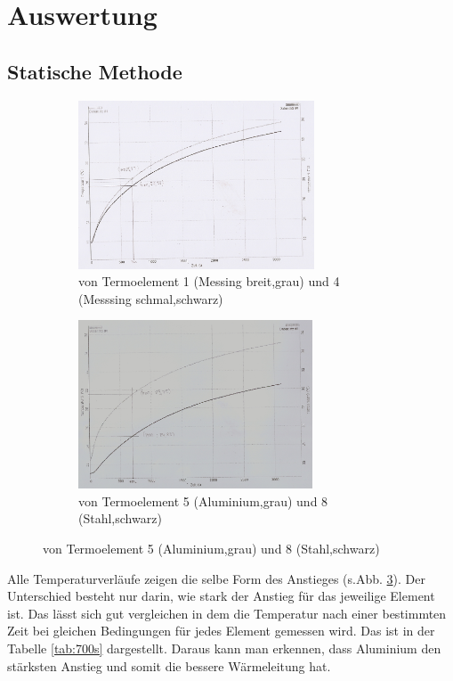 \section{Auswertung}
\label{sec:Auswertung}
\subsection{Statische Methode}
\begin{figure}
  \centering
  \caption{Temperaturverläufe im statischen Fall}
\begin{subfigure}{0.48\textwidth}
  \centering
  \includegraphics[height= 5cm]{logos/T1T4.jpg}
  \caption{von Termoelement 1 (Messing breit,grau) und 4 (Messsing schmal,schwarz)}
  \label{fig:t1t4}
\end{subfigure}
\begin{subfigure}{0.48\textwidth}
  \centering
  \includegraphics[height= 5cm]{logos/T5T8.jpg}
  \caption{von Termoelement 5 (Aluminium,grau) und 8 (Stahl,schwarz)}
  \label{fig:t5t8}
\end{subfigure}
\label{fig:sfall}
\end{figure}
Alle Temperaturverläufe zeigen die selbe Form des Anstieges (s.Abb.
\ref{fig:sfall}). Der Unterschied besteht
nur darin, wie stark der Anstieg für das jeweilige Element ist. Das lässt sich
gut vergleichen in dem die Temperatur nach einer bestimmten Zeit bei gleichen
Bedingungen für jedes Element gemessen wird. Das ist in der Tabelle \ref{tab:700s}
dargestellt. Daraus kann man erkennen, dass Aluminium den stärksten Anstieg und
somit die bessere Wärmeleitung hat.
